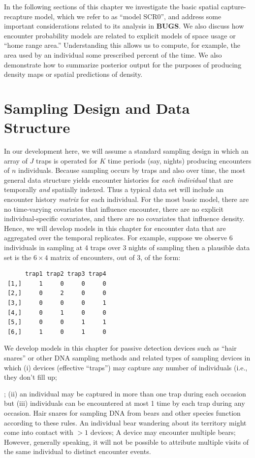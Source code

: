 In the following sections of this chapter we investigate the basic
spatial capture-recapture model, which we refer to as ``model SCR0'',  and address some important
considerations related to its analysis in {\bf BUGS}. 
We also discuss how encounter probability models are related to
explicit models of space usage or ``home range area.'' Understanding
this allows us to compute, for example, the area used by an individual
some prescribed percent of the time. 
We also demonstrate
how to summarize posterior output for the purposes of producing
density maps or spatial predictions of density.




\section{Sampling Design and Data Structure}

In our development here, we will assume a standard sampling design in
which an array of $J$ traps is operated for $K$ time periods (say,
nights) producing encounters of $n$ individuals.  Because sampling
occurs by traps and also over time, the most general data structure
yields encounter histories for {\it each individual} that are
temporally {\it and} spatially indexed. Thus a typical data set will
include an encounter history {\it matrix} for each individual.  For
the most basic model, there are no time-varying covariates that
influence encounter, there are no explicit individual-specific
covariates, and there are no covariates that influence density. Hence, we will
develop models in this chapter for encounter data that are aggregated
over the temporal replicates. For example, suppose we observe 6
individuals in sampling at 4 traps over 3 nights of sampling then a
plausible data set is the $6 \times 4$ matrix of encounters, out of 3,
of the form:
\begin{verbatim}
      trap1 trap2 trap3 trap4
 [1,]     1     0     0     0
 [2,]     0     2     0     0
 [3,]     0     0     0     1
 [4,]     0     1     0     0
 [5,]     0     0     1     1
 [6,]     1     0     1     0
\end{verbatim}

We develop models in this chapter for passive detection 
devices such as ``hair snares''
or other DNA sampling methods \citep{kery_etal:2010,
  gardner_etal:2010jwm} and related types of sampling devices in which
(i) devices (effective ``traps'') may capture any number of individuals (i.e.,
they don't fill up; ; (ii) an individual may be
captured in more than one trap during each occasion but (iii) 
individuals can be encountered at most 1 time by each trap during any
occasion.  Hair snares for sampling DNA from bears and other species
function according to these rules. An individual bear wandering about
its territory might come into contact with  $>1$ devices; A device may
encounter multiple bears; However, generally speaking, it will not be
possible to attribute multiple visits of the same individual to
distinct encounter events.

